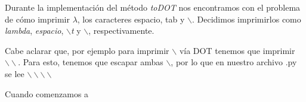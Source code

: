 Durante la implementación del método \emph{toDOT} nos encontramos con el problema de cómo imprimir $\lambda$, los caracteres espacio, tab y $\backslash$. Decidimos imprimirlos como \emph{lambda}, \emph{espacio},  \emph{$\backslash$t} y $\backslash$, respectivamente.

Cabe aclarar que, por ejemplo para imprimir $\backslash$ vía DOT tenemos que imprimir $\backslash\backslash$. Para esto, tenemos que escapar ambas $\backslash$, por lo que en nuestro archivo .py se lee $\backslash\backslash\backslash\backslash$

Cuando comenzamos a 



